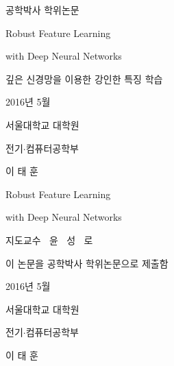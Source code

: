 \def\tTitleA{{Robust Feature Learning}}
\def\tTitleB{{with Deep Neural Networks}}
\def\tTitleK{{깊은 신경망을 이용한 강인한 특징 학습}}
\def\tDepartment{{전기$\cdot$컴퓨터공학부}}
\def\tDate{{2016년 5월}}
\def\tName{{이태훈}}
\def\tNameWithBlank{{이 태 훈}}

\renewcommand{\baselinestretch}{1}
\centering
{\Large \quad \par}
\vspace{.5cm}
{\Large 공학박사 학위논문 \par}
\vspace{2cm}
{\Huge \tTitleA \par}
\vspace{.3cm}
{\Huge \tTitleB \par}
\vspace{2cm}
{\LARGE \tTitleK \par}
\vspace{4.5cm}
{\Large \tDate \par}
\vspace{3cm}
{\LARGE 서울대학교 대학원 \par}
\vspace{.5cm}
{\Large \tDepartment \par}
\vspace{.5cm}
{\LARGE \tNameWithBlank \par}

\clearpage

\centering
{\Large \quad \par}
\vspace{.1cm}
{\Huge \tTitleA \par}
\vspace{.3cm}
{\Huge \tTitleB \par}
\vspace{1.5cm}
{\LARGE 지도교수 $\ $ 윤 $\ $ 성 $\ $ 로 \par}
\vspace{1cm}
{\LARGE 이 논문을 공학박사 학위논문으로 제출함 \par}
\vspace{.2cm}
{\Large \tDate \par}

\vspace{.9cm}
{\LARGE 서울대학교 대학원 \par}
\vspace{.3cm}
{\Large \tDepartment \par}
\vspace{.3cm}
{\LARGE \tNameWithBlank \par}
\vspace{.9cm}

